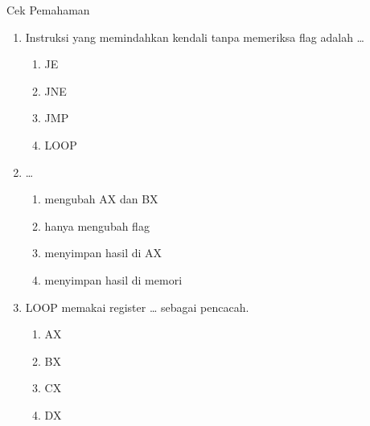 \documentclass[aspectratio=169,11pt]{beamer}
\begin{document}
\begin{frame}{Cek Pemahaman}
\footnotesize
\begin{enumerate}
    \item Instruksi yang memindahkan kendali tanpa memeriksa flag
          adalah \dots
          \begin{enumerate}
              \item JE \quad \item JNE \quad
              \item JMP \quad \item LOOP
          \end{enumerate}

    \vspace{0.2em}
    \item {} \dots
          \begin{enumerate}
              \item mengubah AX dan BX
              \item hanya mengubah flag
              \item menyimpan hasil di AX
              \item menyimpan hasil di memori
          \end{enumerate}

    \vspace{0.2em}
    \item LOOP memakai register \dots{} sebagai pencacah.
          \begin{enumerate}
              \item AX \quad \item BX \quad
              \item CX \quad \item DX
          \end{enumerate}
\end{enumerate}
\end{frame}
\end{document}
